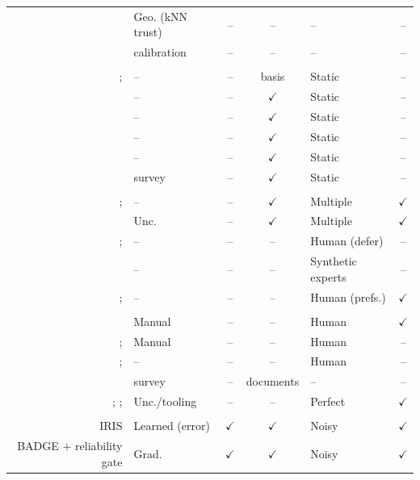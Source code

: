 \documentclass[a4paper,fleqn,longmktitle]{cas-sc}
\newcommand{\method}{IRIS}
\newcommand{\yes}{$\checkmark$}
\newcommand{\no}{--}
\begin{document}
\begin{table}[pos=htbp]
\begin{tabular}{@{}R{0.36}lcclc@{}}
\citet{jiang2018} & Geo. (kNN trust) & \no & \no & \no & \no \\
\citet{guo2017} & calibration & \no & \no & \no & \no \\
\addlinespace
{}\\
\citet{zhang2017}; \citet{arpit2017} & \no & \no & basis & Static & \no \\
\citet{han2018} & \no & \no & \yes & Static & \no \\
\citet{patrini2017} & \no & \no & \yes & Static & \no \\
\citet{li2020} & \no & \no & \yes & Static & \no \\
\citet{northcutt2021} & \no & \no & \yes & Static & \no \\
\citet{song2022} & survey & \no & \yes & Static & \no \\
\addlinespace
{}\\
\citet{raykar2010}; \citet{sheng2008} & \no & \no & \yes & Multiple & \yes \\
\citet{yan2011} & Unc. & \no & \yes & Multiple & \yes \\
\citet{madras2018}; \citet{mozannar2020} & \no & \no & \no & Human (defer) & \no \\
\citet{alves2025} & \no & \no & \no & Synthetic experts & \no \\
\citet{ouyang2022}; \citet{jiang2025} & \no & \no & \no & Human (prefs.) & \yes \\
\addlinespace
{}\\
\citet{petso2026} & Manual & \no & \no & Human & \yes \\
\citet{lou2026}; \citet{feng2026} & Manual & \no & \no & Human & \no \\
\citet{wang2026}; \citet{madduri2026} & \no & \no & \no & Human & \no \\
\citet{hussain2026} & survey & \no & documents & \no & \no \\
\citet{comito2026}; \citet{piccoli2026}; \citet{pensel2026} & Unc./tooling & \no & \no & Perfect & \yes \\
\addlinespace
{}\\
\method{} & Learned (error) & \yes & \yes & Noisy & \yes \\
BADGE $+$ reliability gate & Grad. & \yes & \yes & Noisy & \yes \\
\bottomrule
\end{tabular}
\end{table}
\end{document}
